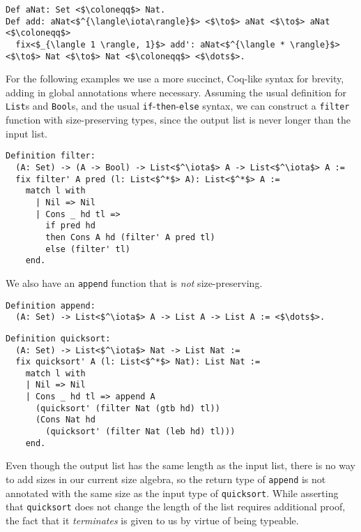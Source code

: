 \documentclass[sigplan,10pt,anonymous,review]{acmart}
\begin{document}
\begin{verbatim}
Def aNat: Set <$\coloneqq$> Nat.
Def add: aNat<$^{\langle\iota\rangle}$> <$\to$> aNat <$\to$> aNat <$\coloneqq$>
  fix<$_{\langle 1 \rangle, 1}$> add': aNat<$^{\langle * \rangle}$> <$\to$> Nat <$\to$> Nat <$\coloneqq$> <$\dots$>.
\end{verbatim}

For the following examples we use a more succinct, Coq-like syntax for brevity, adding in global annotations where necessary. Assuming the usual definition for \texttt{List}s and \texttt{Bool}s, and the usual \texttt{if}-\texttt{then}-\texttt{else} syntax, we can construct a \texttt{filter} function with size-preserving types, since the output list is never longer than the input list.

\begin{verbatim}
Definition filter:
  (A: Set) -> (A -> Bool) -> List<$^\iota$> A -> List<$^\iota$> A :=
  fix filter' A pred (l: List<$^*$> A): List<$^*$> A :=
    match l with
      | Nil => Nil
      | Cons _ hd tl =>
        if pred hd
        then Cons A hd (filter' A pred tl)
        else (filter' tl)
    end.
\end{verbatim}

We also have an \texttt{append} function that is \textit{not} size-preserving. 
\begin{verbatim}
Definition append:
  (A: Set) -> List<$^\iota$> A -> List A -> List A := <$\dots$>.
\end{verbatim}

\begin{verbatim}
Definition quicksort:
  (A: Set) -> List<$^\iota$> Nat -> List Nat :=
  fix quicksort' A (l: List<$^*$> Nat): List Nat :=
    match l with
    | Nil => Nil
    | Cons _ hd tl => append A
      (quicksort' (filter Nat (gtb hd) tl))
      (Cons Nat hd
        (quicksort' (filter Nat (leb hd) tl)))
    end.
\end{verbatim}
Even though the output list has the same length as the input list, there is no way to add sizes in our current size algebra, so the return type of \texttt{append} is not annotated with the same size as the input type of \texttt{quicksort}. While asserting that \texttt{quicksort} does not change the length of the list requires additional proof, the fact that it \textit{terminates} is given to us by virtue of being typeable.
\end{document}
